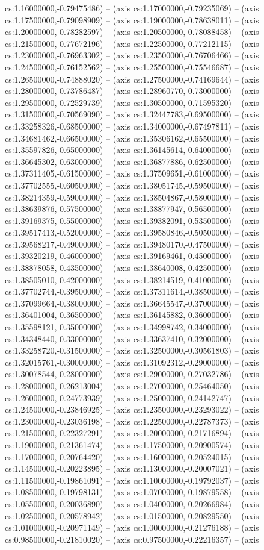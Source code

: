cs:1.16000000,-0.79475486) -- (axis cs:1.17000000,-0.79235069) -- (axis cs:1.17500000,-0.79098909) -- (axis cs:1.19000000,-0.78638011) -- (axis cs:1.20000000,-0.78282597) -- (axis cs:1.20500000,-0.78088458) -- (axis cs:1.21500000,-0.77672196) -- (axis cs:1.22500000,-0.77212115) -- (axis cs:1.23000000,-0.76963302) -- (axis cs:1.23500000,-0.76706466) -- (axis cs:1.24500000,-0.76152562) -- (axis cs:1.25500000,-0.75546687) -- (axis cs:1.26500000,-0.74888020) -- (axis cs:1.27500000,-0.74169644) -- (axis cs:1.28000000,-0.73786487) -- (axis cs:1.28960770,-0.73000000) -- (axis cs:1.29500000,-0.72529739) -- (axis cs:1.30500000,-0.71595320) -- (axis cs:1.31500000,-0.70569090) -- (axis cs:1.32447783,-0.69500000) -- (axis cs:1.33258326,-0.68500000) -- (axis cs:1.34000000,-0.67497811) -- (axis cs:1.34681462,-0.66500000) -- (axis cs:1.35306162,-0.65500000) -- (axis cs:1.35597826,-0.65000000) -- (axis cs:1.36145614,-0.64000000) -- (axis cs:1.36645302,-0.63000000) -- (axis cs:1.36877886,-0.62500000) -- (axis cs:1.37311405,-0.61500000) -- (axis cs:1.37509651,-0.61000000) -- (axis cs:1.37702555,-0.60500000) -- (axis cs:1.38051745,-0.59500000) -- (axis cs:1.38214359,-0.59000000) -- (axis cs:1.38504867,-0.58000000) -- (axis cs:1.38639876,-0.57500000) -- (axis cs:1.38877947,-0.56500000) -- (axis cs:1.39169375,-0.55000000) -- (axis cs:1.39382091,-0.53500000) -- (axis cs:1.39517413,-0.52000000) -- (axis cs:1.39580846,-0.50500000) -- (axis cs:1.39568217,-0.49000000) -- (axis cs:1.39480170,-0.47500000) -- (axis cs:1.39320219,-0.46000000) -- (axis cs:1.39169461,-0.45000000) -- (axis cs:1.38878058,-0.43500000) -- (axis cs:1.38640008,-0.42500000) -- (axis cs:1.38505010,-0.42000000) -- (axis cs:1.38214519,-0.41000000) -- (axis cs:1.37702744,-0.39500000) -- (axis cs:1.37311614,-0.38500000) -- (axis cs:1.37099664,-0.38000000) -- (axis cs:1.36645547,-0.37000000) -- (axis cs:1.36401004,-0.36500000) -- (axis cs:1.36145882,-0.36000000) -- (axis cs:1.35598121,-0.35000000) -- (axis cs:1.34998742,-0.34000000) -- (axis cs:1.34348440,-0.33000000) -- (axis cs:1.33637410,-0.32000000) -- (axis cs:1.33258720,-0.31500000) -- (axis cs:1.32500000,-0.30561803) -- (axis cs:1.32015761,-0.30000000) -- (axis cs:1.31092312,-0.29000000) -- (axis cs:1.30078544,-0.28000000) -- (axis cs:1.29000000,-0.27032786) -- (axis cs:1.28000000,-0.26213004) -- (axis cs:1.27000000,-0.25464050) -- (axis cs:1.26000000,-0.24773939) -- (axis cs:1.25000000,-0.24142747) -- (axis cs:1.24500000,-0.23846925) -- (axis cs:1.23500000,-0.23293022) -- (axis cs:1.23000000,-0.23036198) -- (axis cs:1.22500000,-0.22787373) -- (axis cs:1.21500000,-0.22327291) -- (axis cs:1.20000000,-0.21716894) -- (axis cs:1.19000000,-0.21361474) -- (axis cs:1.17500000,-0.20900574) -- (axis cs:1.17000000,-0.20764420) -- (axis cs:1.16000000,-0.20524015) -- (axis cs:1.14500000,-0.20223895) -- (axis cs:1.13000000,-0.20007021) -- (axis cs:1.11500000,-0.19861091) -- (axis cs:1.10000000,-0.19792037) -- (axis cs:1.08500000,-0.19798131) -- (axis cs:1.07000000,-0.19879558) -- (axis cs:1.05500000,-0.20036890) -- (axis cs:1.04000000,-0.20266984) -- (axis cs:1.02500000,-0.20578942) -- (axis cs:1.01500000,-0.20829550) -- (axis cs:1.01000000,-0.20971149) -- (axis cs:1.00000000,-0.21276188) -- (axis cs:0.98500000,-0.21810020) -- (axis cs:0.97500000,-0.22216357) -- (axis 
